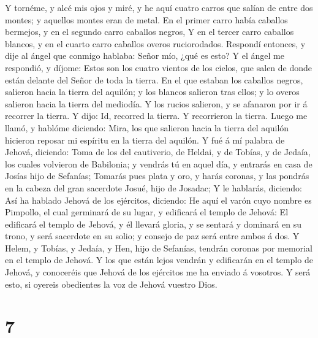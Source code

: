  Y tornéme, y alcé mis ojos y miré, y he aquí cuatro
carros que salían de entre dos montes; y aquellos montes eran de metal.
 En el primer carro había caballos bermejos, y en el
segundo carro caballos negros,  Y en el tercer carro
caballos blancos, y en el cuarto carro caballos overos ruciorodados.
 Respondí entonces, y dije al ángel que conmigo hablaba:
Señor mío, ¿qué es esto?  Y el ángel me respondió, y
díjome: Estos son los cuatro vientos de los cielos, que salen de donde
están delante del Señor de toda la tierra.  En el que
estaban los caballos negros, salieron hacia la tierra del aquilón; y los
blancos salieron tras ellos; y lo overos salieron hacia la tierra del
mediodía.  Y los rucios salieron, y se afanaron por ir á
recorrer la tierra. Y dijo: Id, recorred la tierra. Y recorrieron la
tierra.  Luego me llamó, y hablóme diciendo: Mira, los que
salieron hacia la tierra del aquilón hicieron reposar mi espíritu en la
tierra del aquilón.  Y fué á mí palabra de Jehová,
diciendo:  Toma de los del cautiverio, de Heldai, y de
Tobías, y de Jedaía, los cuales volvieron de Babilonia; y vendrás tú en
aquel día, y entrarás en casa de Josías hijo de Sefanías;
 Tomarás pues plata y oro, y harás coronas, y las pondrás
en la cabeza del gran sacerdote Josué, hijo de Josadac; 
Y le hablarás, diciendo: Así ha hablado Jehová de los ejércitos,
diciendo: He aquí el varón cuyo nombre es Pimpollo, el cual germinará de
su lugar, y edificará el templo de Jehová:  El edificará
el templo de Jehová, y él llevará gloria, y se sentará y dominará en su
trono, y será sacerdote en su solio; y consejo de paz será entre ambos á
dos.  Y Helem, y Tobías, y Jedaía, y Hen, hijo de
Sefanías, tendrán coronas por memorial en el templo de Jehová.
 Y los que están lejos vendrán y edificarán en el templo
de Jehová, y conoceréis que Jehová de los ejércitos me ha enviado á
vosotros. Y será esto, si oyereis obedientes la voz de Jehová vuestro
Dios.

\hypertarget{section-6}{%
\section{7}\label{section-6}}

